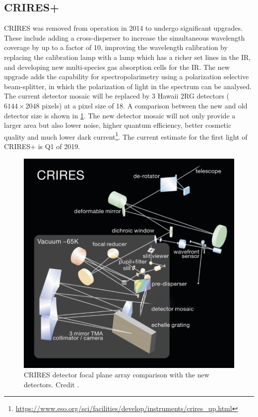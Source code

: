 \subsection{CRIRES+}
CRIRES was removed from operation in 2014 to undergo significant upgrades\citep{dorn_crires_2014}.
These include adding a cross-disperser to increase the simultaneous wavelength coverage by up to a factor of 10, improving the wavelength calibration by replacing the \thar{} calibration lamp with a \une{} lamp which has a richer set lines in the IR, and developing new multi-species gas absorption cells for the IR. 
The new upgrade adds the capability for spectropolarimetry using a polarization selective beam-splitter, in which the polarization of light in the spectrum can be analysed.
The current detector mosaic will be replaced by 3 Hawaii 2RG detectors (\(6144\times 2048\) pixels) at a pixel size of 18\um{}. A comparison between the new and old detector size is shown in \cref{fig:criresplus_detecotrs}. 
The new detector mosaic will not only provide a larger area but also lower noise, higher quantum efficiency, better cosmetic quality and much lower dark current\footnote{\href{https://www.eso.org/sci/facilities/develop/instruments/crires_up.html}{https://www.eso.org/sci/facilities/develop/instruments/crires_up.html}}.
The current estimate for the first light of CRIRES+ is Q1 of 2019.


\begin{figure}
    \centering
    \includegraphics[width=0.5\linewidth]{figures/advanced_material/CRIRES_schematic.pdf}
    \caption{CRIRES detector focal plane array comparison with the new detectors.
        Credit \citep{dorn_crires_2014}.}
    \label{fig:criresplus_detecotrs}
\end{figure}

